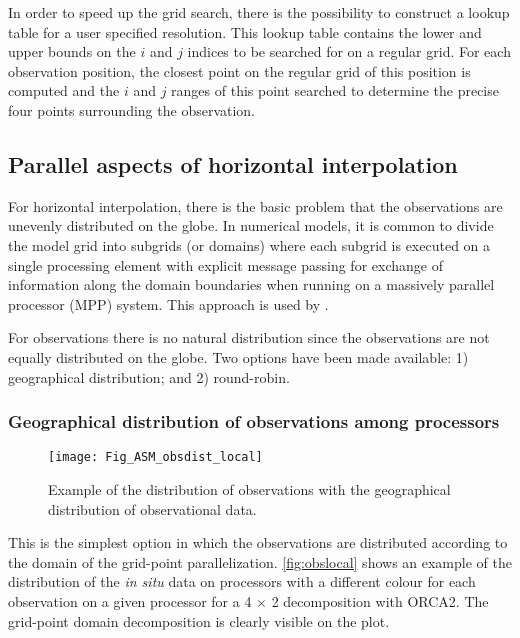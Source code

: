 \documentclass[../tex_main/NEMO_manual]{subfiles}
\begin{document}
In order to speed up the grid search, there is the possibility to construct a lookup table for a user specified resolution.
This lookup table contains the lower and upper bounds on the $i$ and $j$ indices to
be searched for on a regular grid.
For each observation position, the closest point on the regular grid of this position is computed and
the $i$ and $j$ ranges of this point searched to determine the precise four points surrounding the observation. 

\subsection{Parallel aspects of horizontal interpolation}
\label{subsec:OBS_parallel}

For horizontal interpolation, there is the basic problem that
the observations are unevenly distributed on the globe.
In numerical models, it is common to divide the model grid into subgrids (or domains) where
each subgrid is executed on a single processing element with explicit message passing for
exchange of information along the domain boundaries when running on a massively parallel processor (MPP) system.
This approach is used by \NEMO.

For observations there is no natural distribution since the observations are not equally distributed on the globe. 
Two options have been made available:
1) geographical distribution;
and 2) round-robin.

\subsubsection{Geographical distribution of observations among processors}

\begin{figure}      \begin{center}
\texttt{[image: Fig\_ASM\_obsdist\_local]}
\caption{      \protect\label{fig:obslocal}
  Example of the distribution of observations with the geographical distribution of observational data.} 
\end{center}      \end{figure}

This is the simplest option in which the observations are distributed according to
the domain of the grid-point parallelization.
\autoref{fig:obslocal} shows an example of the distribution of the {\em in situ} data on processors with
a different colour for each observation on a given processor for a 4 $\times$ 2 decomposition with ORCA2. 
The grid-point domain decomposition is clearly visible on the plot.
\end{document}
